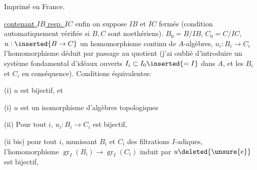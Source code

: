 \begin{center}Imprimé en France.\end{center}



\uline{contenant $IB$ resp. $IC$}\inserted{]}\unsure{,} enfin on suppose $IB$ et $IC$ fermés (condition automatiquement vérifiée si $B,C$ sont noethériens).  $B_0=B/IB$, $C_0=C/IC$, $u:\inserted{B\to C}$ un homomorphisme continu de $A$-algèbres, $u_i:B_i\to C_i$ l'homomorphisme  déduit par passage au quotient (j'ai oublié d'introduire un système fondamental d'idéaux ouverts $I_i\subset I_0\inserted{=I}$ dans $A$, et les $B_i$ et $C_i$ en conséquence). Conditions équivalentes:

(i) $u$ est  bijectif, et 

(i) $u$ est un isomorphisme d'algèbres topologiques

(ii) Pour tout $i$, $u_i:B_i\to C_i$ est bijectif, 

(ii bis) pour tout $i$, munissant $B_i$ et $C_i$ des filtrations $I$-adiques, l'homomorphisme $\operatorname{gr}_I(B_i)\to\operatorname{gr}_I(C_i)$ induit par $u\deleted{\unsure{e}}$ est bijectif, 


